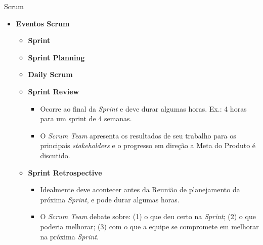 \documentclass{beamer}
\begin{document}
\begin{frame}{Scrum}
	\begin{itemize}
		\item \textbf{Eventos Scrum}
		\begin{itemize}
			\item \textbf{Sprint}
			\item \textbf{Sprint Planning}
			\item \textbf{Daily Scrum}
			\item \textbf{Sprint Review}
				\begin{itemize}
					\justifying
					\item<1> Ocorre ao final da \textit{Sprint} e deve durar algumas horas. Ex.: 4 horas para um sprint de 4 semanas.
					\item<1> O \textit{Scrum Team} apresenta os resultados de seu trabalho para os principais \textit{stakeholders} e o progresso em direção a Meta do Produto é discutido.
				\end{itemize}
			\item<2> \textbf{Sprint Retrospective}
				\begin{itemize}
					\justifying
					\item<2> Idealmente deve acontecer antes da Reunião de planejamento da próxima \textit{Sprint}, e pode durar algumas horas.
					\item<2> O \textit{Scrum Team} debate sobre: (1) o que deu certo na \textit{Sprint}; (2) o que poderia melhorar; (3) com o que a equipe se compromete em melhorar na próxima \textit{Sprint}.
				\end{itemize}
		\end{itemize}
	\end{itemize}
\end{frame}
\end{document}
